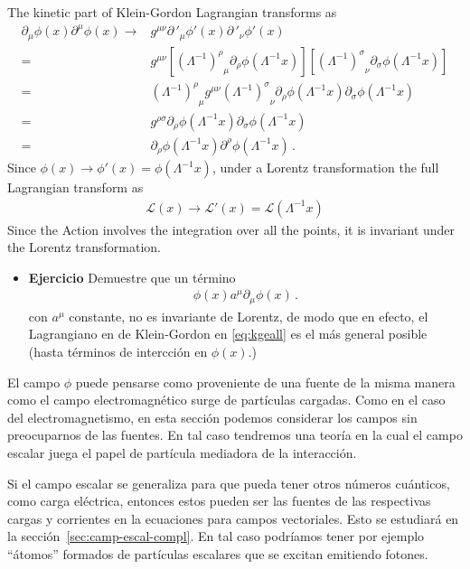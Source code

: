 The kinetic part of Klein-Gordon Lagrangian transforms as
\begin{align}
  \partial_\mu\phi(x)\partial^\mu\phi(x)\to&g^{\mu\nu}{\partial\,'}_\mu\phi'(x){\partial\,'}_\nu\phi'(x)\nonumber\\
  =&g^{\mu\nu}\left[{\left(\Lambda^{-1}\right)^\rho}_\mu\partial_\rho\phi\left(\Lambda^{-1}x\right)\right]
  \left[{\left(\Lambda^{-1}\right)^\sigma}_\nu\partial_\sigma\phi\left(\Lambda^{-1}x\right)\right]\nonumber\\
    =&{\left(\Lambda^{-1}\right)^\rho}_\mu g^{\mu\nu}{\left(\Lambda^{-1}\right)^\sigma}_\nu\partial_\rho\phi\left(\Lambda^{-1}x\right)
  \partial_\sigma\phi\left(\Lambda^{-1}x\right)\nonumber\\
    =&g^{\rho\sigma}\partial_\rho\phi\left(\Lambda^{-1}x\right)
  \partial_\sigma\phi\left(\Lambda^{-1}x\right)\nonumber\\
=&\partial_\rho\phi\left(\Lambda^{-1}x\right)
  \partial^\rho\phi\left(\Lambda^{-1}x\right)\,.
\end{align}
Since $\phi(x)\to\phi'(x)=\phi\left(\Lambda^{-1}x\right)$, under a Lorentz transformation the full Lagrangian transform as
\begin{align}
  \mathcal{L}(x)\to\mathcal{L}'(x)=\mathcal{L}(\Lambda^{-1}x) 
\end{align}
Since the Action involves the integration over all the points, it is invariant under the Lorentz transformation.


\begin{itemize}
\item \textbf{Ejercicio}
Demuestre que un término
\begin{align}
  \phi(x)a^\mu\partial_\mu\phi(x)\,.
\end{align}
con $a^\mu$ constante, no es invariante de Lorentz, de modo que en efecto, el Lagrangiano en de Klein-Gordon en \eqref{eq:kgeall} es el más general posible (hasta términos de intercción en $\phi(x)$.)
\end{itemize}



El campo $\phi$ puede pensarse como proveniente de una fuente de la misma manera como el campo electromagnético surge de partículas cargadas. Como en el caso del electromagnetismo, en esta sección podemos considerar los campos sin preocuparnos de las fuentes. 
En tal caso tendremos una teoría en la cual el campo escalar juega el papel de partícula mediadora de la interacción.

Si el campo escalar se generaliza para que pueda tener otros números
cuánticos, como carga eléctrica, entonces estos pueden ser las fuentes
de las respectivas cargas y corrientes en la ecuaciones para campos
vectoriales. Esto se estudiará en la
sección~\ref{sec:camp-escal-compl}. En tal caso podríamos tener por
ejemplo ``átomos'' formados de partículas escalares que se excitan
emitiendo fotones.


